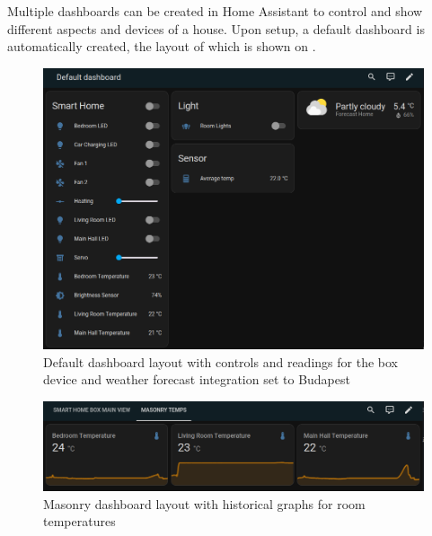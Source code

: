 Multiple dashboards can be created in Home Assistant to control and show different aspects and devices of a house. Upon setup, a default dashboard is automatically created, the layout of which is shown on .

\begin{figure}[!ht]
  \centering
  \includegraphics[width=150mm, keepaspectratio]{figures/homeassistant_dashboard_default.png}
  \caption{Default dashboard layout with controls and readings for the box device and weather forecast integration set to Budapest}
  \label{fig:HAdefaultDashboard}
\end{figure}

\begin{figure}[!ht]
  \centering
  \includegraphics[width=150mm, keepaspectratio]{figures/homeassistant_dashboard_masonry.png}
  \caption{Masonry dashboard layout with historical graphs for room temperatures}
  \label{fig:HAmasonryDashboard}
\end{figure}

